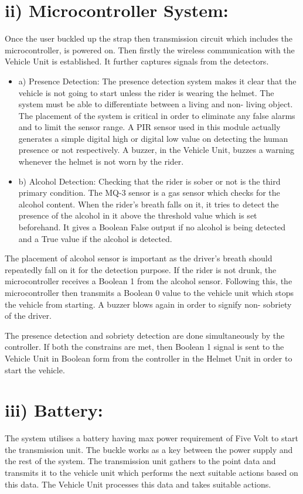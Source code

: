 \section*{ii) Microcontroller System:}
Once the user buckled up the strap then transmission circuit which includes the microcontroller, is powered on. Then firstly the wireless communication with the Vehicle Unit is established. It further captures signals from the detectors.
\begin{itemize}
	\item a) Presence Detection: The presence detection system makes it clear that the vehicle is not going to start unless the rider is wearing the helmet. The system must be able to differentiate between a living and non- living object. The placement of the system is critical in order to eliminate any false alarms and to limit the sensor range. A PIR sensor used in this module actually generates a simple digital high or digital low value on detecting the human presence or not respectively. A buzzer, in the Vehicle Unit, buzzes a warning whenever the helmet is not worn by the rider.
	\item b) Alcohol Detection: Checking that the rider is sober or not is the third primary condition. The MQ-3 sensor is a gas sensor which checks for the alcohol content. When the rider’s breath falls on it, it tries to detect the presence of the alcohol in it above the threshold value which is set beforehand. It gives a Boolean False output if no alcohol is being detected and a True value if the alcohol is detected.
\end{itemize}
The placement of alcohol sensor is important as the driver’s breath should repeatedly fall on it for the detection purpose. If the rider is not drunk, the microcontroller receives a Boolean 1 from the alcohol sensor. Following this, the microcontroller then transmits a Boolean 0 value to the vehicle unit which stops the vehicle from starting. A buzzer blows again in order to signify non- sobriety of the driver.\vspace{.3cm}

The presence detection and sobriety detection are done simultaneously by the controller. If both the constrains are met, then Boolean 1 signal is sent to the Vehicle Unit in Boolean form from the controller in the Helmet Unit in order to start the vehicle.

\section*{iii) Battery:}
The system utilises a battery having max power requirement of Five Volt to start the transmission unit. The buckle works as a key between the power supply and the rest of the system. The transmission unit gathers to the point data and transmits it to the vehicle unit which performs the next suitable actions based on this data. The Vehicle Unit processes this data and takes suitable actions.
